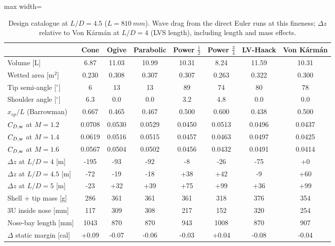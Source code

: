 \begin{table}[H]
\centering
\caption{Design catalogue at $L/D = 4.5$ ($L = \SI{810}{mm}$). Wave drag from the direct Euler runs at this fineness; $\Delta z$ relative to Von K\'arm\'an at $L/D=4$ (LVS length), including length and mass effects.}
\label{tab:catalogue}
\small
\begin{adjustbox}{max width=\textwidth}
\begin{tabular}{@{}lccccccc@{}}
\toprule
 & Cone & Ogive & Parabolic & Power $\tfrac12$ & Power $\tfrac34$ & LV-Haack & Von K\'arm\'an \\
\midrule
Volume [L] & 6.87 & 11.03 & 10.99 & 10.31 & 8.24 & 11.59 & 10.31 \\
Wetted area [m$^2$] & 0.230 & 0.308 & 0.307 & 0.307 & 0.263 & 0.322 & 0.300 \\
Tip semi-angle [$^\circ$] & 6 & 13 & 13 & 89 & 74 & 80 & 78 \\
Shoulder angle [$^\circ$] & 6.3 & 0.0 & 0.0 & 3.2 & 4.8 & 0.0 & 0.0 \\
$x_{cp}/L$ (Barrowman) & 0.667 & 0.465 & 0.467 & 0.500 & 0.600 & 0.438 & 0.500 \\
\midrule
$C_{D,\rm w}$ at $M=1.2$ & 0.0708 & 0.0530 & 0.0529 & 0.0450 & 0.0513 & 0.0496 & 0.0437 \\
$C_{D,\rm w}$ at $M=1.4$ & 0.0619 & 0.0516 & 0.0515 & 0.0457 & 0.0463 & 0.0497 & 0.0425 \\
$C_{D,\rm w}$ at $M=1.6$ & 0.0567 & 0.0504 & 0.0502 & 0.0456 & 0.0432 & 0.0491 & 0.0414 \\
\midrule
$\Delta z$ at $L/D=4$ [m] & -195 & -93 & -92 & -8 & -26 & -75 & +0 \\
$\Delta z$ at $L/D=4.5$ [m] & -72 & -19 & -18 & +38 & +42 & -9 & +60 \\
$\Delta z$ at $L/D=5$ [m] & -23 & +32 & +39 & +75 & +99 & +36 & +99 \\
\midrule
Shell + tip mass [g] & 286 & 361 & 361 & 361 & 318 & 376 & 354 \\
3U inside nose [mm] & 117 & 309 & 308 & 217 & 152 & 320 & 254 \\
Nose-bay length [mm] & 1043 & 870 & 870 & 943 & 1008 & 870 & 907 \\
$\Delta$ static margin [cal] & +0.09 & -0.07 & -0.06 & -0.03 & +0.04 & -0.08 & -0.04 \\
\bottomrule
\end{tabular}
\end{adjustbox}
\end{table}
